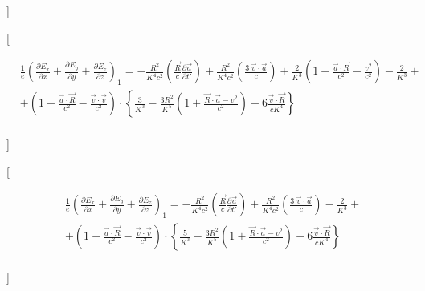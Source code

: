 \documentclass[11pt]{article}
\begin{document}
{]}

{[}

\begin{align}
  & \frac{1}{e}{{\left( \frac{\partial {{E}_{x}}}{\partial x}+\frac{\partial {{E}_{y}}}{\partial y}+\frac{\partial {{E}_{z}}}{\partial z} \right)}_{1}}=-\frac{{{R}^{2}}}{{{K}^{4}}{{c}^{2}}}\left( \frac{\overrightarrow{R}}{c}\frac{\partial \overrightarrow{a}}{\partial t'} \right)+\frac{{{R}^{2}}}{{{K}^{4}}{{c}^{2}}}\left( \frac{3\ \overrightarrow{v}\cdot \overrightarrow{a}}{c} \right)+\frac{2}{{{K}^{3}}}\left( 1+\frac{\overrightarrow{a}\cdot \overrightarrow{R}}{{{c}^{2}}}-\frac{{{v}^{2}}}{{{c}^{2}}} \right)-\frac{2}{{{K}^{3}}}+ \\ 
 & +\left( 1+\frac{\overrightarrow{a}\cdot \overrightarrow{R}}{{{c}^{2}}}-\frac{\overrightarrow{v}\cdot \overrightarrow{v}}{{{c}^{2}}} \right)\cdot \left\{ \frac{3}{{{K}^{3}}}-\frac{3{{R}^{2}}}{{{K}^{5}}}\left( 1+\frac{\overrightarrow{R}\cdot \overrightarrow{a}-{{v}^{2}}}{{{c}^{2}}} \right)+6\frac{\overrightarrow{v}\cdot \overrightarrow{R}}{c{{K}^{4}}} \right\} \\ 
\end{align}

{]}

{[}

\begin{align}
  & \frac{1}{e}{{\left( \frac{\partial {{E}_{x}}}{\partial x}+\frac{\partial {{E}_{y}}}{\partial y}+\frac{\partial {{E}_{z}}}{\partial z} \right)}_{1}}=-\frac{{{R}^{2}}}{{{K}^{4}}{{c}^{2}}}\left( \frac{\overrightarrow{R}}{c}\frac{\partial \overrightarrow{a}}{\partial t'} \right)+\frac{{{R}^{2}}}{{{K}^{4}}{{c}^{2}}}\left( \frac{3\ \overrightarrow{v}\cdot \overrightarrow{a}}{c} \right)-\frac{2}{{{K}^{3}}}+ \\ 
 & +\left( 1+\frac{\overrightarrow{a}\cdot \overrightarrow{R}}{{{c}^{2}}}-\frac{\overrightarrow{v}\cdot \overrightarrow{v}}{{{c}^{2}}} \right)\cdot \left\{ \frac{5}{{{K}^{3}}}-\frac{3{{R}^{2}}}{{{K}^{5}}}\left( 1+\frac{\overrightarrow{R}\cdot \overrightarrow{a}-{{v}^{2}}}{{{c}^{2}}} \right)+6\frac{\overrightarrow{v}\cdot \overrightarrow{R}}{c{{K}^{4}}} \right\} \\ 
\end{align}

{]}
\end{document}
